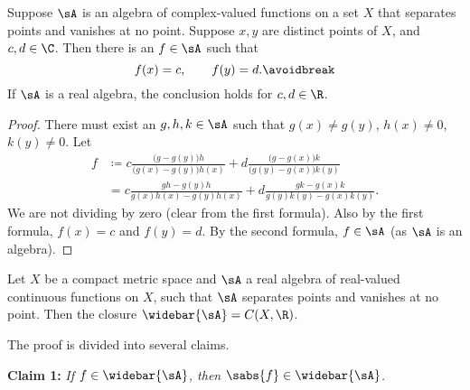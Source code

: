 \begin{prop} \label{prop:SWinterpolate}
Suppose $\sA$ is an algebra of complex-valued functions on a set $X$ that separates points
and vanishes at no point.  Suppose $x,y$ are distinct points of $X$, and
$c,d \in \C$.  Then there is an $f \in \sA$ such that
\begin{equation*}
f(x) = c, \qquad f(y) = d .
\avoidbreak
\end{equation*}
If $\sA$ is a real algebra, the conclusion holds for $c,d \in \R$.
\end{prop}

\begin{proof}
There must exist an $g,h,k \in \sA$
such that 
$g(x) \not= g(y)$, $h(x) \not= 0$, $k(y) \not= 0$.
Let
\begin{equation*}
\begin{split}
f & \coloneqq 
c
\frac{\bigl(g - g(y)\bigr)h}{\bigl(g(x)-g(y)\bigr)h(x) } + 
d
\frac{\bigl(g - g(x)\bigr)k}{\bigl(g(y)-g(x)\bigr)k(y)}
\\
& =
c
\frac{gh - g(y)h}{g(x)h(x)-g(y)h(x) } + 
d
\frac{gk - g(x)k}{g(y)k(y)-g(x)k(y)} .
\end{split}
\end{equation*}
We are not dividing by zero (clear from the first formula).
Also by the first formula, $f(x) = c$ and $f(y) = d$.
By the second formula, $f \in \sA$ (as $\sA$ is an algebra).
\end{proof}

\begin{thm}
\label{thm:SWreal}%
%
Let $X$ be a compact metric space and $\sA$ a real algebra of real-valued
continuous functions on $X$, such that $\sA$ separates points and vanishes at
no point.  Then the closure $\widebar{\sA} = C(X,\R)$.
\end{thm}

The proof is divided into several claims.

\medskip

\noindent
\textbf{Claim 1:} \emph{If $f \in \widebar{\sA}$, then $\sabs{f} \in
\widebar{\sA}$.}

